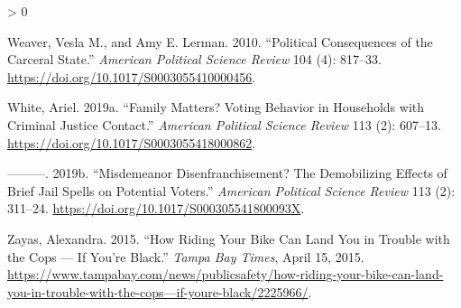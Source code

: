 \documentclass[
  12pt,
]{article}
\newlength{\cslhangindent}
\newenvironment{CSLReferences}[2] %
 {%
  \setlength{\parindent}{0pt}
  \ifodd #1 \everypar{\setlength{\hangindent}{\cslhangindent}}\ignorespaces\fi
  \ifnum #2 > 0
  \setlength{\parskip}{#2\baselineskip}
  \fi
 }%
 {}
\begin{document}
\begin{CSLReferences}{1}{0}
\leavevmode\hypertarget{ref-Weaver2010}{}%
Weaver, Vesla M., and Amy E. Lerman. 2010. {``Political {Consequences} of the {Carceral State}.''} \emph{American Political Science Review} 104 (4): 817--33. \url{https://doi.org/10.1017/S0003055410000456}.

\leavevmode\hypertarget{ref-White2019}{}%
White, Ariel. 2019a. {``Family {Matters}? {Voting Behavior} in {Households} with {Criminal Justice Contact}.''} \emph{American Political Science Review} 113 (2): 607--13. \url{https://doi.org/10.1017/S0003055418000862}.

\leavevmode\hypertarget{ref-White2019a}{}%
---------. 2019b. {``Misdemeanor {Disenfranchisement}? {The Demobilizing Effects} of {Brief Jail Spells} on {Potential Voters}.''} \emph{American Political Science Review} 113 (2): 311--24. \url{https://doi.org/10.1017/S000305541800093X}.

\leavevmode\hypertarget{ref-Zayas2015}{}%
Zayas, Alexandra. 2015. {``How Riding Your Bike Can Land You in Trouble with the Cops --- If You're Black.''} \emph{Tampa Bay Times}, April 15, 2015. \url{https://www.tampabay.com/news/publicsafety/how-riding-your-bike-can-land-you-in-trouble-with-the-cops—if-youre-black/2225966/}.

\end{CSLReferences}
\end{document}
